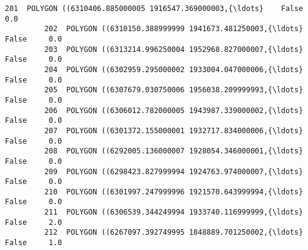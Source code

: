 \documentclass[11pt]{article}
\begin{document}
\begin{Verbatim}[commandchars=\\\{\}]
         201  POLYGON ((6310406.885000005 1916547.369000003,{\ldots}    False     0.0   
         202  POLYGON ((6310150.388999999 1941673.481250003,{\ldots}    False     0.0   
         203  POLYGON ((6313214.996250004 1952968.827000007,{\ldots}    False     0.0   
         204  POLYGON ((6302959.295000002 1933004.047000006,{\ldots}    False     0.0   
         205  POLYGON ((6307679.030750006 1956038.209999993,{\ldots}    False     0.0   
         206  POLYGON ((6306012.782000005 1943987.339000002,{\ldots}    False     0.0   
         207  POLYGON ((6301372.155000001 1932717.834000006,{\ldots}    False     0.0   
         208  POLYGON ((6292005.136000007 1928054.346000001,{\ldots}    False     0.0   
         209  POLYGON ((6298423.827999994 1924763.974000007,{\ldots}    False     0.0   
         210  POLYGON ((6301997.247999996 1921570.643999994,{\ldots}    False     0.0   
         211  POLYGON ((6306539.344249994 1933740.116999999,{\ldots}    False     2.0   
         212  POLYGON ((6267097.392749995 1848889.701250002,{\ldots}    False     1.0   
         

\end{Verbatim}
\end{document}
